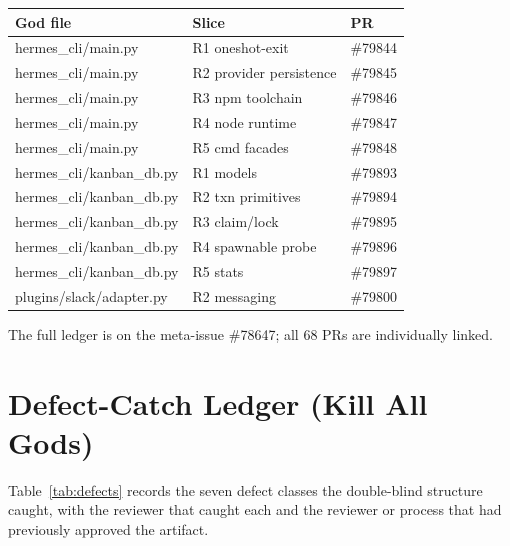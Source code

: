 \documentclass[11pt]{article}
\theoremstyle{definition}
\theoremstyle{plain}
\theoremstyle{remark}
\begin{document}
\begin{center}
\begin{tabular}{@{}lll@{}}
\toprule
God file & Slice & PR \\
\midrule
hermes\_cli/main.py & R1 oneshot-exit & \#79844 \\
hermes\_cli/main.py & R2 provider persistence & \#79845 \\
hermes\_cli/main.py & R3 npm toolchain & \#79846 \\
hermes\_cli/main.py & R4 node runtime & \#79847 \\
hermes\_cli/main.py & R5 cmd facades & \#79848 \\
hermes\_cli/kanban\_db.py & R1 models & \#79893 \\
hermes\_cli/kanban\_db.py & R2 txn primitives & \#79894 \\
hermes\_cli/kanban\_db.py & R3 claim/lock & \#79895 \\
hermes\_cli/kanban\_db.py & R4 spawnable probe & \#79896 \\
hermes\_cli/kanban\_db.py & R5 stats & \#79897 \\
plugins/slack/adapter.py & R2 messaging & \#79800 \\
\bottomrule
\end{tabular}
\end{center}

The full ledger is on the meta-issue \#78647; all 68 PRs are individually
linked.

\section{Defect-Catch Ledger (Kill All Gods)}
\label{app:defects}

Table~\ref{tab:defects} records the seven defect classes the double-blind
structure caught, with the reviewer that caught each and the reviewer or
process that had previously approved the artifact.
\end{document}
